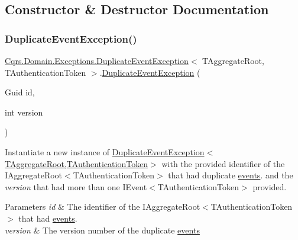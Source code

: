\subsection{Constructor \& Destructor Documentation}
\mbox{\label{classCqrs_1_1Domain_1_1Exceptions_1_1DuplicateEventException_a33eb0ada16fe2395ea921f571e45c415_a33eb0ada16fe2395ea921f571e45c415}} 
\subsubsection{\texorpdfstring{Duplicate\+Event\+Exception()}{DuplicateEventException()}}
{\footnotesize\ttfamily \hyperlink{classCqrs_1_1Domain_1_1Exceptions_1_1DuplicateEventException}{Cqrs.\+Domain.\+Exceptions.\+Duplicate\+Event\+Exception}$<$ T\+Aggregate\+Root, T\+Authentication\+Token $>$.\hyperlink{classCqrs_1_1Domain_1_1Exceptions_1_1DuplicateEventException}{Duplicate\+Event\+Exception} (\begin{DoxyParamCaption}\item[{Guid}]{id,  }\item[{int}]{version }\end{DoxyParamCaption})}



Instantiate a new instance of \hyperlink{classCqrs_1_1Domain_1_1Exceptions_1_1DuplicateEventException_a33eb0ada16fe2395ea921f571e45c415_a33eb0ada16fe2395ea921f571e45c415}{Duplicate\+Event\+Exception$<$\+T\+Aggregate\+Root,\+T\+Authentication\+Token$>$} with the provided identifier of the I\+Aggregate\+Root$<$\+T\+Authentication\+Token$>$ that had duplicate \hyperlink{}{events}. and the {\itshape version}  that had more than one I\+Event$<$\+T\+Authentication\+Token$>$ provided. 


\begin{DoxyParams}{Parameters}
{\em id} & The identifier of the I\+Aggregate\+Root$<$\+T\+Authentication\+Token$>$ that had \hyperlink{}{events}.\\
\hline
{\em version} & The version number of the duplicate \hyperlink{}{events}\\
\hline
\end{DoxyParams}


